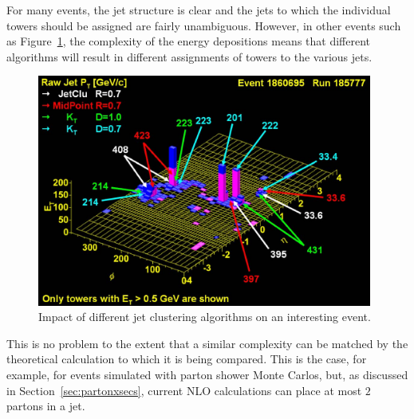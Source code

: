 \documentclass[12pt]{iopart}
\begin{document}
For many events, the jet structure is clear and the jets to which the individual towers  should be assigned are fairly unambiguous.
However, in other events such as Figure~\ref{fig:lego}, the complexity of the energy  depositions means that different algorithms will
result in different assignments of towers  to the various jets.
%
\begin{figure}[t]
\begin{center}
\includegraphics[width=11cm]{lego_r185777_e1860695.eps}
\end{center}
\caption{
Impact of different jet clustering algorithms on an interesting event. 
\label{fig:lego}}
\end{figure}
%
This is no problem to the extent that a similar complexity can be matched by the theoretical calculation to which it is being
compared. This is the case, for example, for events simulated with parton shower Monte Carlos, but, as discussed in Section~\ref{sec:partonxsecs}, current NLO
calculations can place at most $2$ partons in a jet.
\end{document}
